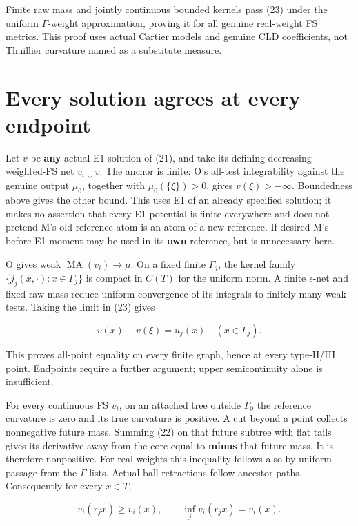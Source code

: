 \documentclass[
  11pt,
]{article}
\begin{document}
Finite raw mass and jointly continuous bounded kernels pass (23) under
the uniform \(\Gamma\)-weight approximation, proving it for all genuine
real-weight FS metrics. This proof uses actual Cartier models and
genuine CLD coefficients, not Thuillier curvature named as a substitute
measure.

\section{Every solution agrees at every
endpoint}\label{every-solution-agrees-at-every-endpoint}

Let \(v\) be \textbf{any} actual E1 solution of (21), and take its
defining decreasing weighted-FS net \(v_i\downarrow v\). The anchor is
finite: O's all-test integrability against the genuine output \(\mu_0\),
together with \(\mu_0(\{\xi\})>0\), gives \(v(\xi)>-\infty\).
Boundedness above gives the other bound. This uses E1 of an already
specified solution; it makes no assertion that every E1 potential is
finite everywhere and does not pretend M's old reference atom is an atom
of a new reference. If desired M's before-E1 moment may be used in its
\textbf{own} reference, but is unnecessary here.

O gives weak \(\operatorname{MA}(v_i)\to\mu\). On a fixed finite
\(\Gamma_j\), the kernel family \(\{j_j(x,\cdot):x\in\Gamma_j\}\) is
compact in \(C(T)\) for the uniform norm. A finite \(\epsilon\)-net and
fixed raw mass reduce uniform convergence of its integrals to finitely
many weak tests. Taking the limit in (23) gives

\[
                  v(x)-v(\xi)=u_j(x)\quad(x\in\Gamma_j).           \tag{24}
\]

This proves all-point equality on every finite graph, hence at every
type-II/III point. Endpoints require a further argument; upper
semicontinuity alone is insufficient.

For every continuous FS \(v_i\), on an attached tree outside
\(\Gamma_0\) the reference curvature is zero and its true curvature is
positive. A cut beyond a point collects nonnegative future mass. Summing
(22) on that future subtree with flat tails gives its derivative away
from the core equal to \textbf{minus} that future mass. It is therefore
nonpositive. For real weights this inequality follows also by uniform
passage from the \(\Gamma\) lists. Actual ball retractions follow
ancestor paths. Consequently for every \(x\in T\),

\[
 v_i(r_jx)\geq v_i(x),\qquad
                   \inf_jv_i(r_jx)=v_i(x).                         \tag{25}
\]
\end{document}
